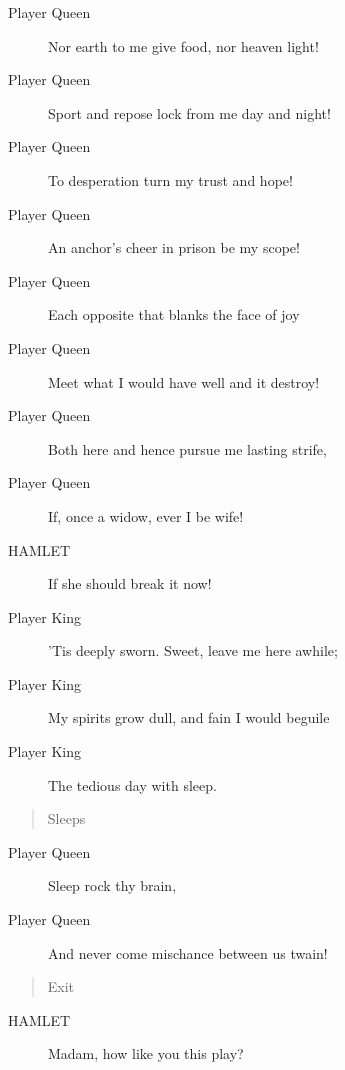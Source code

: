 \documentclass{article}
\begin{document}
\begin{description}
            
\item[Player Queen] Nor earth to me give food, nor heaven light!
\item[Player Queen] Sport and repose lock from me day and night!
\item[Player Queen] To desperation turn my trust and hope!
\item[Player Queen] An anchor's cheer in prison be my scope!
\item[Player Queen] Each opposite that blanks the face of joy
\item[Player Queen] Meet what I would have well and it destroy!
\item[Player Queen] Both here and hence pursue me lasting strife,
\item[Player Queen] If, once a widow, ever I be wife!
\end{description}
          
\begin{description}
            
\item[HAMLET] If she should break it now!
\end{description}
          
\begin{description}
            
\item[Player King] 'Tis deeply sworn. Sweet, leave me here awhile;
\item[Player King] My spirits grow dull, and fain I would beguile
\item[Player King] The tedious day with sleep.
\end{description}
          
\begin{quote}
Sleeps
\end{quote}
          
\begin{description}
            
\item[Player Queen] Sleep rock thy brain,
\item[Player Queen] And never come mischance between us twain!
\end{description}
          
\begin{quote}
Exit
\end{quote}
          
\begin{description}
            
\item[HAMLET] Madam, how like you this play?
\end{description}
          
\end{document}
